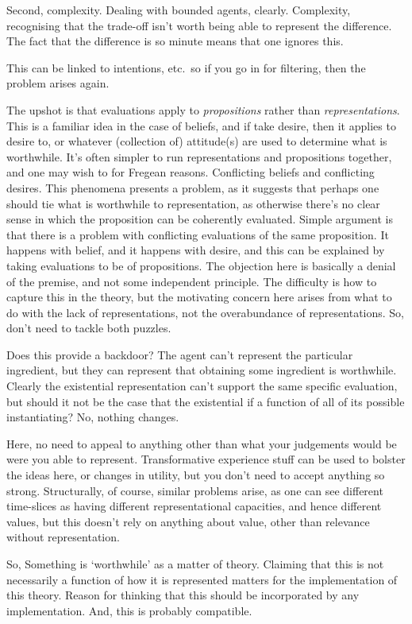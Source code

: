 \documentclass[10pt]{article}
\begin{document}
Second, complexity.
Dealing with bounded agents, clearly.
Complexity, recognising that the trade-off isn't worth being able to represent the difference.
The fact that the difference is so minute means that one ignores this.

This can be linked to intentions, etc.\ so if you go in for filtering, then the problem arises again.


The upshot is that evaluations apply to \emph{propositions} rather than \emph{representations}.
This is a familiar idea in the case of beliefs, and if take desire, then it applies to desire to, or whatever (collection of) attitude(s) are used to determine what is worthwhile.
It's often simpler to run representations and propositions together, and one may wish to for Fregean reasons.
Conflicting beliefs and conflicting desires.
This phenomena presents a problem, as it suggests that perhaps one should tie what is worthwhile to representation, as otherwise there's no clear sense in which the proposition can be coherently evaluated.
Simple argument is that there is a problem with conflicting evaluations of the same proposition.
It happens with belief, and it happens with desire, and this can be explained by taking evaluations to be of propositions.
The objection here is basically a denial of the premise, and not some independent principle.
The difficulty is how to capture this in the theory, but the motivating concern here arises from what to do with the lack of representations, not the overabundance of representations.
So, don't need to tackle both puzzles.

Does this provide a backdoor?
The agent can't represent the particular ingredient, but they can represent that obtaining some ingredient is worthwhile.
Clearly the existential representation can't support the same specific evaluation, but should it not be the case that the existential if a function of all of its possible instantiating?
No, nothing changes.

Here, no need to appeal to anything other than what your judgements would be were you able to represent.
Transformative experience stuff can be used to bolster the ideas here, or changes in utility, but you don't need to accept anything so strong.
Structurally, of course, similar problems arise, as one can see different time-slices as having different representational capacities, and hence different values, but this doesn't rely on anything about value, other than relevance without representation.

So, 
Something is `worthwhile' as a matter of theory.
Claiming that this is not necessarily a function of how it is represented matters for the implementation of this theory.
Reason for thinking that this should be incorporated by any implementation.
And, this is probably compatible.
\end{document}
